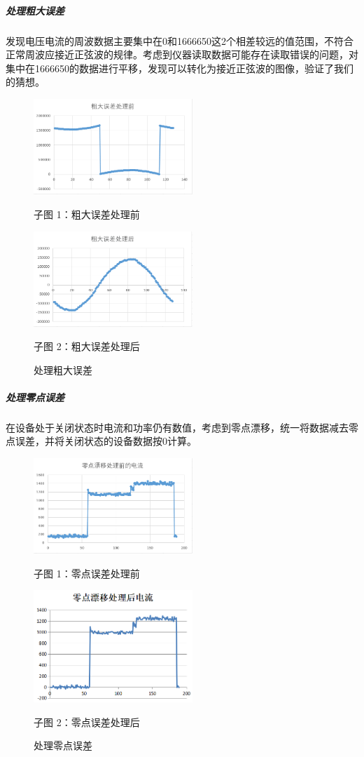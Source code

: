 \documentclass[UTF8]{article}
\begin{document}
\subparagraph{处理粗大误差}
\indent 发现电压电流的周波数据主要集中在0和1666650这2个相差较远的值范围，不符合正常周波应接近正弦波的规律。考虑到仪器读取数据可能存在读取错误的问题，对集中在1666650的数据进行平移，发现可以转化为接近正弦波的图像，验证了我们的猜想。
\begin{figure}[htbp]
\centering
\begin{minipage}[htbp]{7cm}
\centering
\includegraphics[width=6cm]{g1.png}
\caption*{子图 1：粗大误差处理前}
\end{minipage}
\begin{minipage}[htbp]{7cm}
\centering
\includegraphics[width=6cm]{g2.png}
\caption*{子图 2：粗大误差处理后}
\end{minipage}
\caption{处理粗大误差}
\end{figure}

\subparagraph{处理零点误差}
\indent 在设备处于关闭状态时电流和功率仍有数值，考虑到零点漂移，统一将数据减去零点误差，并将关闭状态的设备数据按0计算。
\begin{figure}[htbp]
\centering
\begin{minipage}[htbp]{7cm}
\centering
\includegraphics[width=6cm]{z1.png}
\caption*{子图 1：零点误差处理前}
\end{minipage}
\begin{minipage}[htbp]{7cm}
\centering
\includegraphics[width=6cm]{z2.png}
\caption*{子图 2：零点误差处理后}
\end{minipage}
\caption{处理零点误差}
\end{figure}
\end{document}
